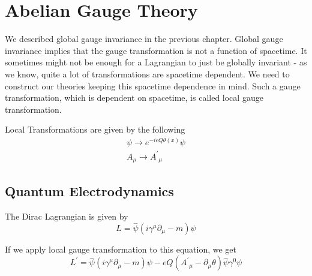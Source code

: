 
\chapter{Abelian Gauge Theory} %

\label{Chapter2} %



We described global gauge invariance in the previous chapter. Global gauge invariance implies that the gauge transformation is not a function of spacetime. It sometimes might not be enough for a Lagrangian to just be globally invariant - as we know, quite a lot of transformations are spacetime dependent. We need to construct our theories keeping this spacetime dependence in mind. Such a gauge transformation, which is dependent on spacetime, is called local gauge transformation.

Local Transformations are given by the following
\begin{subequations}
\begin{align}
\psi \xrightarrow{} e^{-ieQ{\theta}(x)}\psi\\
A_\mu \xrightarrow{} {A^'}_\mu
\end{align}
\end{subequations}

\section{Quantum Electrodynamics}
The Dirac Lagrangian is given by
\begin{equation}
{L} = \overset{-}{\psi}(i{\gamma^\mu}\partial_\mu-m)\psi
\end{equation}

If we apply local gauge transformation to this equation, we get
\begin{equation}
{L^'}= \overset{-}{\psi}(i\gamma^\mu\partial_{\mu}-m)\psi-eQ({A^'}_{\mu}-\partial_\mu\theta)\overset{-}\psi\gamma^0\psi
\end{equation}

